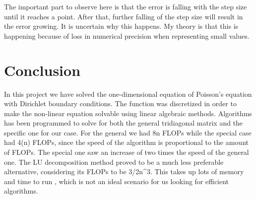 \documentclass{article}
\begin{document}
The important part to observe here is that the error is falling with the step size until it reaches a point. After that, further falling of the step size will result in the error growing. It is uncertain why this happens. My theory is that this is happening because of loss in numerical precision when representing small values.

\section{Conclusion}
In this project we have solved the one-dimensional equation of Poisson's equation with Dirichlet boundary conditions. The function was discretized in order to make the non-linear equation solvable using linear algebraic methods. Algorithms has been programmed to solve for both the general tridiagonal matrix and the specific one for our case. For the general we had 8n FLOPs while the special case had 4(n) FLOPs, since the speed of the algorithm is proportional to the amount of FLOPs. The special one saw an increase of two times the speed of the general one. The LU decomposition method proved to be a much less preferable alternative, considering its FLOPs to be {3/2n^3}. This takes up lots of memory and time to run , which is not an ideal scenario for us looking for efficient algorithms.


\citep{CompFys2015MHJ}






\end{document}
